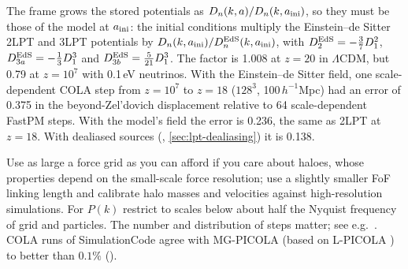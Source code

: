 The frame grows the stored potentials as $D_n(k,a)/D_n(k,a_{\rm ini})$, so they must be those of the model at
$a_{\rm ini}$: the initial conditions multiply the Einstein--de Sitter 2LPT and 3LPT potentials by
$D_n(k,a_{\rm ini})/D_n^{\rm EdS}(k,a_{\rm ini})$, with $D_2^{\rm EdS}=-\tfrac37D_1^2$, $D_{3a}^{\rm EdS}=-\tfrac13D_1^3$
and $D_{3b}^{\rm EdS}=\tfrac5{21}D_1^3$. The factor is 1.008 at $z=20$ in $\Lambda$CDM, but 0.79 at $z=10^7$ with 0.1\,eV
neutrinos. With the Einstein--de Sitter field, one scale-dependent COLA step from $z=10^7$ to $z=18$ ($128^3$,
100\,$h^{-1}$Mpc) had an error of 0.375 in the beyond-Zel'dovich displacement relative to 64 scale-dependent FastPM steps.
With the model's field the error is 0.236, the same as 2LPT at $z=18$. With dealiased sources
(, \cref{sec:lpt-dealiasing}) it is 0.138.

\begin{caveat}
Use as large a force grid as you can afford if you care about haloes, whose properties depend on the small-scale
force resolution; use a slightly smaller FoF linking length and calibrate halo masses and velocities against
high-resolution simulations. For $P(k)$ restrict to scales below about half the Nyquist frequency of grid and particles.
The number and distribution of steps matter; see e.g.\ \cite{Izard2016}. COLA runs of SimulationCode agree with
MG-PICOLA \cite{Winther2017} (based on L-PICOLA \cite{Howlett2015}) to better than $0.1\%$ ().
\end{caveat}
